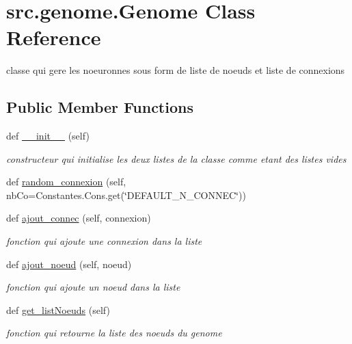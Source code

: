 \hypertarget{classsrc_1_1genome_1_1_genome}{}\section{src.\+genome.\+Genome Class Reference}
\label{classsrc_1_1genome_1_1_genome}


classe qui gere les noeuronnes sous form de liste de noeuds et liste de connexions  


\subsection*{Public Member Functions}
\begin{DoxyCompactItemize}
\item 
def \hyperlink{classsrc_1_1genome_1_1_genome_a02fe9fb1e8d803a095ad16c76b53c8f9}{\+\_\+\+\_\+init\+\_\+\+\_\+} (self)
\begin{DoxyCompactList}\small\item\em constructeur qui initialise les deux listes de la classe comme etant des listes vides \end{DoxyCompactList}\item 
def \hyperlink{classsrc_1_1genome_1_1_genome_a5c4aafd46df32ddc9b44fbb07829570e}{random\+\_\+connexion} (self, nb\+Co=Constantes.\+Cons.\+get(\char`\"{}D\+E\+F\+A\+U\+L\+T\+\_\+\+N\+\_\+\+C\+O\+N\+N\+EC\char`\"{}))
\item 
def \hyperlink{classsrc_1_1genome_1_1_genome_a0dd3e631bdf10fca02fca63b07a39e2a}{ajout\+\_\+connec} (self, connexion)
\begin{DoxyCompactList}\small\item\em fonction qui ajoute une connexion dans la liste \end{DoxyCompactList}\item 
def \hyperlink{classsrc_1_1genome_1_1_genome_a9a2f1ed5bfdea103e70042df7c2ee193}{ajout\+\_\+noeud} (self, noeud)
\begin{DoxyCompactList}\small\item\em fonction qui ajoute un noeud dans la liste \end{DoxyCompactList}\item 
def \hyperlink{classsrc_1_1genome_1_1_genome_a7b991ac9dbccefc376cd37752a14bcbc}{get\+\_\+list\+Noeuds} (self)
\begin{DoxyCompactList}\small\item\em fonction qui retourne la liste des noeuds du genome \end{DoxyCompactList}\item 

\end{DoxyCompactItemize}
